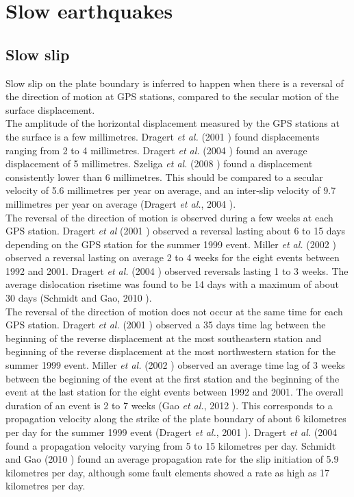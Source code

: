\documentclass[main.tex]{subfiles}
\begin{document}
\part{Slow earthquakes}

\chapter{Slow slip}

Slow slip on the plate boundary is inferred to happen when there is a reversal of the direction of motion at GPS stations, compared to the secular motion of the surface displacement. \\

The amplitude of the horizontal displacement measured by the GPS stations at the surface is a few millimetres. Dragert \textit{et al.} (2001 \cite{DRA_2001}) found displacements ranging from 2 to 4 millimetres. Dragert \textit{et al.} (2004 \cite{DRA_2004}) found an average displacement of 5 millimetres. Szeliga \textit{et al.} (2008 \cite{SZE_2008}) found a displacement consistently lower than 6 millimetres. This should be compared to a secular velocity of 5.6 millimetres per year on average, and an inter-slip velocity of 9.7 millimetres per year on average (Dragert \textit{et al.}, 2004 \cite{DRA_2004}). \\

The reversal of the direction of motion is observed during a few weeks at each GPS station. Dragert \textit{et al} (2001 \cite{DRA_2001}) observed a reversal lasting about 6 to 15 days depending on the GPS station for the summer 1999 event. Miller \textit{et al.} (2002 \cite{MIL_2002}) observed a reversal lasting on average 2 to 4 weeks for the eight events between 1992 and 2001. Dragert \textit{et al.} (2004 \cite{DRA_2004}) observed reversals lasting 1 to 3 weeks. The average dislocation risetime was found to be 14 days with a maximum of about 30 days (Schmidt and Gao, 2010 \cite{SCH_2010}).\\
 
The reversal of the direction of motion does not occur at the same time for each GPS station. Dragert \textit{et al.} (2001 \cite{DRA_2001}) observed a 35 days time lag between the beginning of the reverse displacement at the most southeastern station and beginning of the reverse displacement at the most northwestern station for the summer 1999 event. Miller \textit{et al.} (2002 \cite{MIL_2002}) observed an average time lag of 3 weeks between the beginning of the event at the first station and the beginning of the event at the last station for the eight events between 1992 and 2001. The overall duration of an event is 2 to 7 weeks (Gao \textit{et al.}, 2012 \cite{GAO_2012}). This corresponds to a propagation velocity along the strike of the plate boundary of about 6 kilometres per day for the summer 1999 event (Dragert \textit{et al.}, 2001 \cite{DRA_2001}). Dragert \textit{et al.} (2004 \cite{DRA_2004} found a propagation velocity varying from 5 to 15 kilometres per day. Schmidt and Gao (2010 \cite{SCH_2010}) found an average propagation rate for the slip initiation of 5.9 kilometres per day, although some fault elements showed a rate as high as 17 kilometres per day. \\
\end{document}
